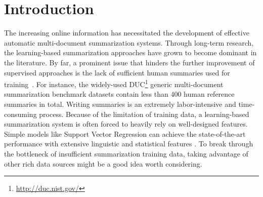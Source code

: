\documentclass[letterpaper]{article}
\begin{document}
\section{Introduction}
The increasing online information has necessitated the development of effective automatic multi-document summarization systems.
Through long-term research, the learning-based summarization approaches have grown to become dominant in the literature.
By far, a prominent issue that hinders the further improvement of supervised approaches is the lack of sufficient human summaries used for training~\cite{ziqiang2016tgsum}.
For instance, the widely-used DUC\footnote{\url{http://duc.nist.gov/}} generic multi-document summarization benchmark datasets contain less than 400 human reference summaries in total.
Writing summaries is an extremely labor-intensive and time-consuming process.
Because of the limitation of training data, a learning-based summarization system is often forced to heavily rely on well-designed features.
Simple models like Support Vector Regression can achieve the state-of-the-art performance with extensive linguistic and statistical features \cite{hong2014improving}.
To break through the bottleneck of insufficient summarization training data, taking advantage of other rich data sources might be a good idea worth considering.
\end{document}
